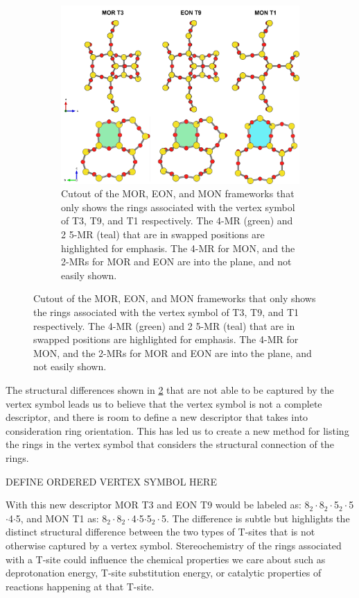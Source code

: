 \documentclass[11pt]{article}
\begin{document}
\begin{figure}
\begin{figure}[H]
\centering
\includegraphics[width=\textwidth]{figures/chapter-3/stereo.pdf}
\caption{Cutout of the MOR, EON, and MON frameworks that only shows the rings associated with the vertex symbol of T3, T9, and T1 respectively. The 4-MR (green) and 2\texttimes{} 5-MR (teal) that are in swapped positions are highlighted for emphasis. The 4-MR for MON, and the 2-MRs for MOR and EON are into the plane, and not easily shown. \label{fig:stereo}}
\end{figure}
\end{figure}

The structural differences shown in \cref{fig:stereo} that are not able to be captured by the vertex symbol leads us to believe that the vertex symbol is not a complete descriptor, and there is room to define a new descriptor that takes into consideration ring orientation. This has led us to create a new method for listing the rings in the vertex symbol that considers the structural connection of the rings. 

DEFINE ORDERED VERTEX SYMBOL HERE

With this new descriptor MOR T3 and EON T9 would be labeled as: 8\(_{\text{2}} \cdot\)8\(_{\text{2}} \cdot\)5\(_{\text{2}} \cdot\)5\(\cdot\)4\(\cdot\)5, and MON T1 as: 8\(_{\text{2}} \cdot\)8\(_{\text{2}} \cdot\)4\(\cdot\)5\(\cdot\)5\(_{\text{2}} \cdot\)5. The difference is subtle but highlights the distinct structural difference between the two types of T-sites that is not otherwise captured by a vertex symbol. Stereochemistry of the rings associated with a T-site could influence the chemical properties we care about such as deprotonation energy, T-site substitution energy, or catalytic properties of reactions happening at that T-site.
\end{document}
